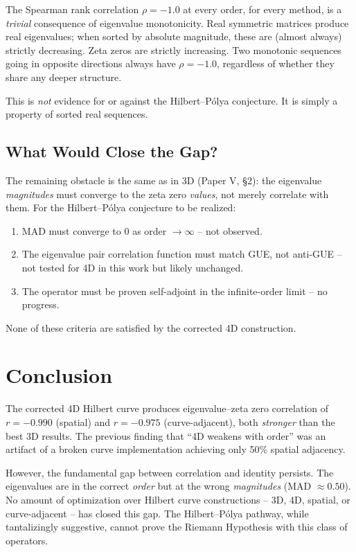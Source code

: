 \documentclass[11pt,a4paper]{article}
\begin{document}
The Spearman rank correlation $\rho = -1.0$ at every order, for every
method, is a \emph{trivial} consequence of eigenvalue monotonicity.  Real
symmetric matrices produce real eigenvalues; when sorted by absolute
magnitude, these are (almost always) strictly decreasing.  Zeta zeros are
strictly increasing.  Two monotonic sequences going in opposite
directions always have $\rho = -1.0$, regardless of whether they share
any deeper structure.

This is \emph{not} evidence for or against the Hilbert--P\'{o}lya
conjecture.  It is simply a property of sorted real sequences.

\subsection{What Would Close the Gap?}

The remaining obstacle is the same as in 3D (Paper V, \S2): the
eigenvalue \emph{magnitudes} must converge to the zeta zero
\emph{values}, not merely correlate with them.  For the
Hilbert--P\'{o}lya conjecture to be realized:

\begin{enumerate}
\item MAD must converge to 0 as order $\to \infty$ -- not observed.
\item The eigenvalue pair correlation function must match GUE, not
   anti-GUE -- not tested for 4D in this work but likely unchanged.
\item The operator must be proven self-adjoint in the infinite-order
   limit -- no progress.
\end{enumerate}

None of these criteria are satisfied by the corrected 4D construction.

\section{Conclusion}

The corrected 4D Hilbert curve produces eigenvalue--zeta zero correlation
of $r = -0.990$ (spatial) and $r = -0.975$ (curve-adjacent), both
\emph{stronger} than the best 3D results.  The previous finding that
``4D weakens with order'' was an artifact of a broken curve
implementation achieving only 50\% spatial adjacency.

However, the fundamental gap between correlation and identity persists.
The eigenvalues are in the correct \emph{order} but at the wrong
\emph{magnitudes} (MAD $\approx 0.50$).  No amount of optimization over
Hilbert curve constructions -- 3D, 4D, spatial, or curve-adjacent -- has
closed this gap.  The Hilbert--P\'{o}lya pathway, while tantalizingly
suggestive, cannot prove the Riemann Hypothesis with this class of
operators.
\end{document}
